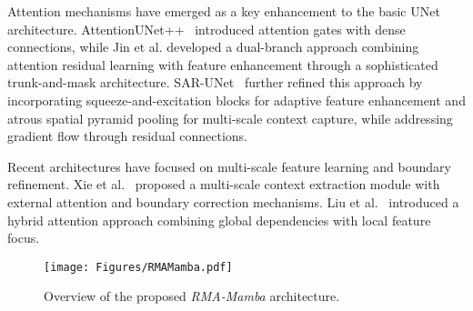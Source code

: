 Attention mechanisms have emerged as a key enhancement to the basic UNet architecture. AttentionUNet++~\cite{li2020attention} introduced attention gates with dense connections, while Jin et al. developed a dual-branch approach combining attention residual learning with feature enhancement through a sophisticated trunk-and-mask architecture. SAR-UNet~\cite{WANG2021sar-unet} further refined this approach by incorporating squeeze-and-excitation blocks for adaptive feature enhancement and atrous spatial pyramid pooling for multi-scale context capture, while addressing gradient flow through residual connections.

Recent architectures have focused on multi-scale feature learning and boundary refinement. Xie et al.~\cite{xie2022mci} proposed a multi-scale context extraction module with external attention and boundary correction mechanisms. Liu et al.~\cite{liu2023gcha} introduced a hybrid attention approach combining global dependencies with local feature focus. %

\begin{figure*} [!t]
    \centering
    \texttt{[image: Figures/RMAMamba.pdf]}
    \caption{Overview of the proposed \textit{RMA-Mamba} architecture.}
    \label{fig:RMAMamba}
\end{figure*}